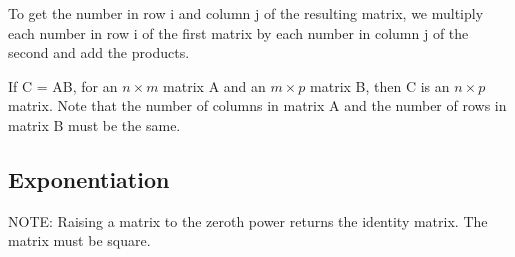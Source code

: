 To get the number in row i and column j of the resulting matrix, we multiply each number in row i of the first matrix by each number in column j of the second and add the products.

If C = AB, for an $n \times m$ matrix A and an $m \times p$ matrix B, then C is an $n \times p$ matrix. Note that the number of columns in matrix A and the number of rows in matrix B must be the same.



\subsection*{Exponentiation}

NOTE: Raising a matrix to the zeroth power returns the identity matrix. The matrix must be square.



\newpage